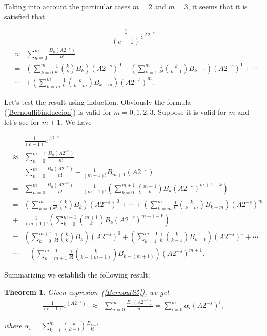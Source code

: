 \documentclass[preprint,10pt,numbers,sort&compress]{elsarticle}
\newtheorem{Theorem}{\bf Theorem}[section]
\begin{document}
Taking into account the particular cases $m=2$ and $m=3$, it seems that it is satisfied that

$$
\frac{1}{\left(e-1 \right)}e^{A 2^{-s}} 
$$
\begin{eqnarray}\label{Bernoulli6induccion}
 & \approx & \sum_{n=0}^m \frac{B_n\left(A 2^{-s}\right)}{n!} \nonumber \\
&=& \left(\sum_{k=0}^{m} \frac{1}{k!} {k \choose k} B_k \right) \left(A 2^{-s}\right)^0 + \left(\sum_{k=1}^{m} \frac{1}{k!} {k \choose k-1} B_{k-1} \right) \left(A 2^{-s}\right)^1+\cdots \nonumber \\
&\cdots& + \left(\sum_{k=m}^{m} \frac{1}{k!} {k \choose k-m} B_{k-m} \right) \left(A 2^{-s}\right)^m.
\end{eqnarray}

Let's test the result using induction. Obviously the formula (\ref{Bernoulli6induccion}) is valid for $m=0,1,2,3$. Suppose it is valid for $m$ and let's see for $m+1$. We have


\begin{eqnarray*}
& & \frac{1}{\left(e-1 \right)}e^{A 2^{-s}}  \\
& \approx & \sum_{n=0}^{m+1} \frac{B_n\left(A 2^{-s}\right)}{n!} \\
& = & \sum_{n=0}^{m} \frac{B_n\left(A 2^{-s}\right)}{n!}+\frac{1}{(m+1)!} B_{m+1}\left(A 2^{-s}\right) \\
& = &  \sum_{n=0}^{m} \frac{B_n\left(A 2^{-s}\right)}{n!}+\frac{1}{(m+1)!}\left(  \sum_{k=0}^{m+1} {m+1 \choose k} B_k \left(A 2^{-s}\right)^{m+1-k} \right)\\
&=& \!\!\left(\sum_{k=0}^{m} \frac{1}{k!} {k \choose k} B_k \right)\!\!\left(\!A 2^{-s}\right)^0+\cdots+\!\left(\sum_{k=m}^{m} \frac{1}{k!} {k \choose k\!-\!m} B_{k-m} \right)\!\!\left(\!A 2^{-s}\right)^m\\
&+& \frac{1}{(m+1)!}\left(  \sum_{k=0}^{m+1} {m+1 \choose k} B_k \left(A 2^{-s}\right)^{m+1-k} \right) \\
&=& \left(\sum_{k=0}^{m+1} \frac{1}{k!} {k \choose k} B_k \right)\!\!\left(\!A 2^{-s}\right)^0\!+\!\left(\sum_{k=1}^{m+1} \frac{1}{k!} {k \choose k\!-\!1} B_{k-1} \right)\!\!\left(\!A 2^{-s}\right)^1\!+\cdots \\
&\cdots& +\left(\sum_{k=m+1}^{m+1} \frac{1}{k!} {k \choose k\!-\!(m\!+\!1)} B_{k-(m+1)} \right)\!\!\left(A 2^{-s}\right)^{m+1}.
\end{eqnarray*}

Summarizing we establish the following result:

\begin{Theorem} Given expresion~(\ref{Bernoulli5}), we get
\begin{eqnarray}\label{miaBernoulli1}
\frac{1}{\left(e-1 \right)}e^{\left(A 2^{-s}\right)} &\approx &  \sum_{n=0}^m \frac{B_n\left(A 2^{-s}\right)}{n!}= \sum_{i=0}^m \alpha_{i} \left(A 2^{-s}\right)^{i},
\end{eqnarray}

where $\displaystyle \alpha_{i} = \sum_{k=i}^{m} {k \choose k-i} \frac{B_{k-i}}{k!}$.
\end{Theorem}
\end{document}

